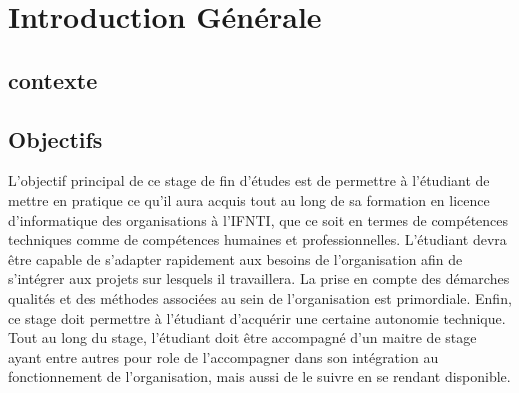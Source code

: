 \chapter{Introduction Générale}
\clearpage
\section{contexte}



\section{Objectifs}
L’objectif principal de ce stage de fin d’études est de permettre à l’étudiant de mettre en pratique ce qu’il aura acquis tout au long de sa formation en licence d’informatique des organisations à l’IFNTI, que ce soit en termes de compétences techniques comme de compétences humaines et professionnelles. L’étudiant devra être capable de s’adapter rapidement aux besoins de l’organisation afin de s’intégrer aux projets sur lesquels il travaillera. La prise en compte des démarches qualités et des méthodes associées au sein de l’organisation est primordiale. Enfin, ce stage doit permettre à l’étudiant d’acquérir une certaine autonomie technique.\\
Tout au long du stage, l’étudiant doit être accompagné d’un maitre de stage ayant entre autres pour role de l’accompagner dans son intégration au fonctionnement de l’organisation, mais aussi de le suivre en se rendant disponible.